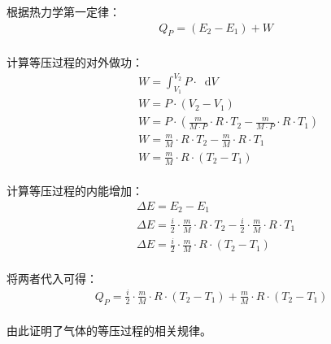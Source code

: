 \documentclass[UTF8]{ctexart}
\newcommand*{\dif}{\mathop{}\!\mathrm{d}}
\begin{document}
\newpage

    根据热力学第一定律：
    \begin{align}
        &Q_P=(E_2-E_1)+W
    \end{align}\\
    计算等压过程的对外做功：
    \begin{align}
        &~~~~~~~~~~W=\int_{V_1}^{V_2} P\cdot\dif V\\[4mm]
        &~~~~~~~~~~W=P\cdot(V_2-V_1)\\[4mm]
        &~~~~~~~~~~W=P\cdot\left(\frac{m}{M\cdot P}\cdot R\cdot T_2-\frac{m}{M\cdot P}\cdot R\cdot T_1\right)\\[4mm]
        &~~~~~~~~~~W=\frac{m}{M}\cdot R\cdot T_2-\frac{m}{M}\cdot R\cdot T_1\\[4mm]
        &~~~~~~~~~~W=\frac{m}{M}\cdot R\cdot (T_2-T_1)
    \end{align}\\
    计算等压过程的内能增加：
    \begin{align}
        &\Delta E=E_2-E_1\\[4mm]
        &\Delta E=\frac{i}{2}\cdot\frac{m}{M}\cdot R\cdot T_2-\frac{i}{2}\cdot\frac{m}{M}\cdot R\cdot T_1\\[4mm]
        &\Delta E=\frac{i}{2}\cdot\frac{m}{M}\cdot R\cdot (T_2-T_1)
    \end{align}\\
    将两者代入可得：
    \begin{align}
        Q_P=\frac{i}{2}\cdot\frac{m}{M}\cdot R\cdot(T_2-T_1)+\frac{m}{M}\cdot R\cdot(T_2-T_1)
    \end{align}\\
    由此证明了气体的等压过程的相关规律。

\newpage
\end{document}
